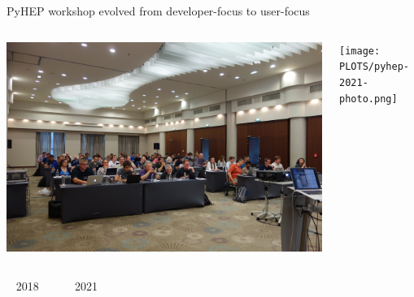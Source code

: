 \documentclass[aspectratio=169]{beamer}
\begin{document}
\begin{frame}{PyHEP workshop evolved from developer-focus to user-focus}
\Large
\vspace{0.35 cm}

\begin{columns}
\includegraphics[width=\linewidth]{PLOTS/pyhep-2018-photo.jpg}

\texttt{[image: PLOTS/pyhep-2021-photo.png]}

\end{columns}

\vspace{0.1 cm}
\begin{columns}
\mbox{ } \hfill 2018 \hfill \mbox{ }

\mbox{ } \hfill 2021 \hfill \mbox{ }

\end{columns}
\end{frame}
\end{document}
